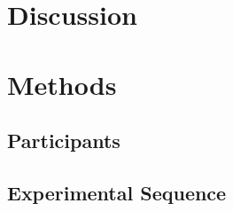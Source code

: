 \documentclass[letterpaper,11pt]{article}
\begin{document}
\lipsum[7-8]

\section*{Discussion}

\lipsum[9-11]


\newpage
\section*{Methods}

\subsection*{Participants}
\lipsum[12]

\subsection*{Experimental Sequence}
\lipsum[13-14]


\newpage
\nolinenumbers

\end{document}
